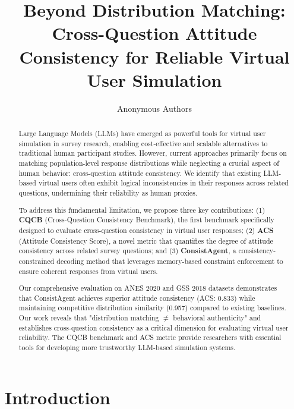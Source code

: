 \documentclass[sigconf, anonymous]{acmart}
\begin{document}
\title{Beyond Distribution Matching: Cross-Question Attitude Consistency for Reliable Virtual User Simulation}

\author{Anonymous Authors}

\begin{abstract}
Large Language Models (LLMs) have emerged as powerful tools for virtual user simulation in survey research, enabling cost-effective and scalable alternatives to traditional human participant studies. However, current approaches primarily focus on matching population-level response distributions while neglecting a crucial aspect of human behavior: cross-question attitude consistency. We identify that existing LLM-based virtual users often exhibit logical inconsistencies in their responses across related questions, undermining their reliability as human proxies.

To address this fundamental limitation, we propose three key contributions: (1) \textbf{CQCB} (Cross-Question Consistency Benchmark), the first benchmark specifically designed to evaluate cross-question consistency in virtual user responses; (2) \textbf{ACS} (Attitude Consistency Score), a novel metric that quantifies the degree of attitude consistency across related survey questions; and (3) \textbf{ConsistAgent}, a consistency-constrained decoding method that leverages memory-based constraint enforcement to ensure coherent responses from virtual users.

Our comprehensive evaluation on ANES 2020 and GSS 2018 datasets demonstrates that ConsistAgent achieves superior attitude consistency (ACS: 0.833) while maintaining competitive distribution similarity (0.957) compared to existing baselines. Our work reveals that "distribution matching $\neq$ behavioral authenticity" and establishes cross-question consistency as a critical dimension for evaluating virtual user reliability. The CQCB benchmark and ACS metric provide researchers with essential tools for developing more trustworthy LLM-based simulation systems.
\end{abstract}


\maketitle

\section{Introduction}
\end{document}
